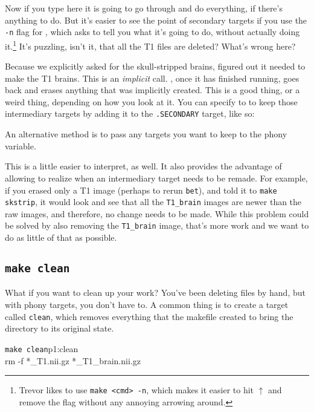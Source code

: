Now if you type \maken{} here it is going to go through and do everything, if there's anything to do. But it's easier to see the point of secondary targets if you use the \texttt{-n} flag for \maken{}, which asks \maken{} to tell you what it's going to do, without actually doing it.\footnote{Trevor likes to use \texttt{make <cmd> -n}, which makes it easier to hit $\uparrow$ and remove the flag without any annoying arrowing around.} It's puzzling, isn't it, that all the T1 files are deleted? What's wrong here?

Because we explicitly asked for the skull-stripped brains, \maken{} figured out it needed to make the T1 brains. This is an \emph{implicit} call. \maken, once it has finished running, goes back and erases anything that was implicitly created. This is a good thing, or a weird thing, depending on how you look at it. You can specify to \maken{} to keep those intermediary targets by adding it to the \texttt{.SECONDARY} target, like so:

An alternative method is to pass any targets you want to keep to the phony variable.

This is a little easier to interpret, as well. It also provides the advantage of allowing \maken{} to realize when an intermediary target needs to be remade. For example, if you erased only a T1 image (perhaps to rerun \texttt{bet}), and told it to \texttt{make skstrip}, it would look and see that all the \texttt{T1_brain} images are newer than the raw images, and therefore, no change needs to be made. While this problem could be solved by also removing the \texttt{T1_brain} image, that's more work and we want to do as little of that as possible.

\subsection{\texttt{make clean}}

What if you want to clean up your work? You've been deleting files by hand, but with phony targets, you don't have to. A common thing is to create a target called \texttt{clean}, which removes everything that the makefile created to bring the directory to its original state.

\begin{make}{\texttt{make clean}}{p1:clean}
	\\
	\tab rm -f *_T1.nii.gz *_T1_brain.nii.gz
\end{make}

